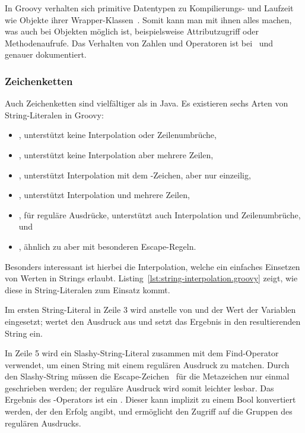 In Groovy verhalten sich primitive Datentypen zu Kompilierungs- und Laufzeit wie Objekte ihrer Wrapper-Klassen~\cite[Abs.~10.]{groovy-lang:differences}.
Somit kann man mit ihnen alles machen, was auch bei Objekten möglich ist, beispielsweise Attributzugriff oder Methodenaufrufe.
Das Verhalten von Zahlen und Operatoren ist bei~\cite[Abs.~5.]{groovy-lang:syntax} und ~\cite[Abs.~10.]{groovy-lang:operators} genauer dokumentiert.

\subsubsection{Zeichenketten}\label{subsubsec:strings}

Auch Zeichenketten sind vielfältiger als in Java.
Es existieren sechs Arten von String-Literalen in Groovy:

\begin{itemize}\setlength{\itemsep}{0pt}\setlength{\parskip}{0pt}\setlength{\parsep}{0pt}
\item {}, unterstützt keine Interpolation oder Zeilenumbrüche,
\item {}, unterstützt keine Interpolation aber mehrere Zeilen,
\item {}, unterstützt Interpolation mit dem \code{$}-Zeichen, aber nur einzeilig,
\item {}, unterstützt Interpolation und mehrere Zeilen,
\item {}, für reguläre Ausdrücke, unterstützt auch Interpolation und Zeilenumbrüche, und
\item {}, ähnlich zu  aber mit besonderen Escape-Regeln.
\end{itemize}

Besonders interessant ist hierbei die Interpolation, welche ein einfaches Einsetzen von Werten in Strings erlaubt.
Listing~\ref{lst:string-interpolation.groovy} zeigt, wie diese in String-Literalen zum Einsatz kommt.


Im ersten String-Literal in Zeile 3 wird anstelle von  und  der Wert der Variablen eingesetzt;
 wertet den Ausdruck  aus und setzt das Ergebnis in den resultierenden String ein.

In Zeile 5 wird ein Slashy-String-Literal zusammen mit dem Find-Operator \code{=~} verwendet, um einen String mit einem regulären Ausdruck zu matchen.
Durch den Slashy-String müssen die Escape-Zeichen~\plain{\ } für die Metazeichen nur einmal geschrieben werden; der reguläre Ausdruck wird somit leichter lesbar.
Das Ergebnis des \code{=~}-Operators ist ein .
Dieser kann implizit zu einem Bool konvertiert werden, der den Erfolg angibt, und ermöglicht den Zugriff auf die Gruppen des regulären Ausdrucks.

